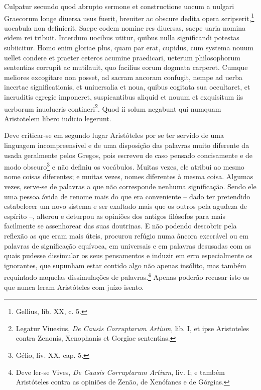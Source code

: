 \documentclass{article}
\begin{document}
\begin{paracol}{3}
\begin{nthcolumn}{2}
  \end{nthcolumn}
  \vspace{0.5cm}
  \begin{nthcolumn*}{0} %
    Culpatur secundo quod abrupto sermone et constructione uocum a uulgari Graecorum longe diuersa usus fuerit, breuiter ac obscure dedita opera scripserit,\footnote[31]{Gellius, lib. XX, c. 5.} uocabula non definierit. Saepe eodem nomine res diuersas, saepe uaria nomina eidem rei tribuit. Interdum uocibus utitur, quibus nulla significandi potestas subiicitur. Homo enim gloriae plus, quam par erat, cupidus, cum systema nouum uellet condere et praeter ceteros acumine praedicari, ueterum philosophorum sententias corrupit ac mutilauit, quo facilius eorum dogmata carperet. Cumque meliores excogitare non posset, ad sacram ancoram confugit, nempe ad uerba incertae significationis, et uniuersalia et noua, quibus cogitata sua occultaret, et ineruditis egregie imponeret, suspicantibus aliquid et nouum et exquisitum iis uerborum inuolucris contineri\footnote[32]{Legatur Viuesius, \emph{De Causis Corruptarum Artium}, lib. I, et ipse Aristoteles contra Zenonis, Xenophanis et Gorgiae sententias.}. Quod ii solum negabunt qui numquam Aristotelem libero iudicio legerunt.
  \end{nthcolumn*}
  \vspace{0.5cm}
  \begin{nthcolumn}{1} %
    Deve criticar-se em segundo lugar Aristóteles por se ter servido de uma linguagem incompreensível e de uma disposição das palavras muito diferente da usada geralmente pelos Gregos, pois escreveu de caso pensado concisamente e de modo obscuro\footnote[31]{Gélio, liv. XX, cap. 5.} e não definiu os vocábulos. Muitas vezes, ele atribui ao mesmo nome coisas diferentes; e muitas vezes, nomes diferentes à mesma coisa. Algumas vezes, serve‑se de palavras a que não corresponde nenhuma significação. Sendo ele uma pessoa ávida de renome mais do que era conveniente – dado ter pretendido estabelecer um novo sistema e ser exaltado mais que os outros pela agudeza de espírito –, alterou e deturpou as opiniões dos antigos filósofos para mais facilmente se assenhorear das suas doutrinas. E não podendo descobrir pela reflexão as que eram mais úteis, procurou refúgio numa âncora execrável ou em palavras de significação equívoca, em universais e em palavras desusadas com as quais pudesse dissimular os seus pensamentos e induzir em erro especialmente os ignorantes, que supunham estar contido algo não apenas insólito, mas também requintado naquelas dissimulações de palavras.\footnote[32]{Deve ler-se Vives, \emph{De Causis Corruptarum Artium}, liv. I; e também Aristóteles contra as opiniões de Zenão, de Xenófanes e de Górgias.} Apenas poderão recusar isto os que nunca leram Aristóteles com juízo isento.

\end{nthcolumn}
\end{paracol}
\end{document}
